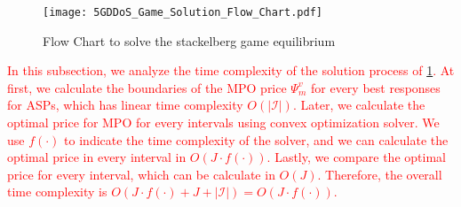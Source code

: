 \documentclass[10pt,journal, compsoc]{IEEEtran}
\begin{document}
\begin{figure}
    \centering
    \texttt{[image: 5GDDoS\_Game\_Solution\_Flow\_Chart.pdf]}
    \caption{Flow Chart to solve the stackelberg game equilibrium}
    \label{fig:flow_chart_sol}
\end{figure}
\textcolor{red}{
In this subsection, we analyze the time complexity of the solution process of \cref{fig:flow_chart_sol}. At first, we calculate the boundaries of the MPO price $\Psi^v_m$ for every best responses for ASPs, which has linear time complexity $O(|\mathcal{I}|)$. Later, we calculate the optimal price for MPO for every intervals using convex optimization solver. We use $f(\cdot)$ to indicate the time complexity of the solver, and we can calculate the optimal price in every interval in $O(J\cdot f(\cdot))$. Lastly, we compare the optimal price for every interval, which can be calculate in $O(J)$. Therefore, the overall time complexity is $O(J\cdot f(\cdot) + J + |\mathcal{I}|) = O(J\cdot f(\cdot))$.}
\end{document}
